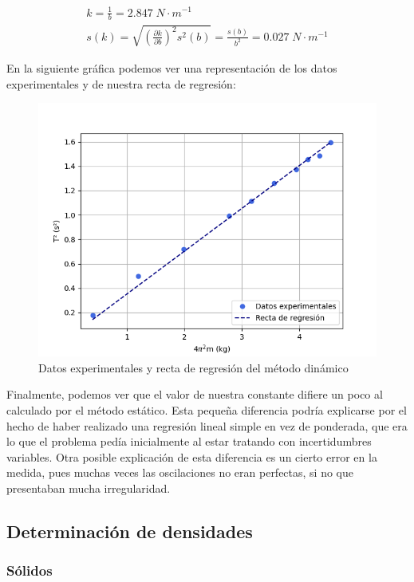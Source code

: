 \documentclass[a4paper,12pt,titlepage]{article}
\begin{document}
\begin{equation}
    \begin{gathered}
        k = \frac{1}{b} = 2.847 \; N\cdot m^{-1} \\
        s(k) = \sqrt{\left (\frac{\partial k}{\partial b} \right )^2s^2(b)} = \frac{s(b)}{b^2} = 0.027 \; N\cdot m^{-1}
    \end{gathered}
\end{equation}

En la siguiente gráfica podemos ver una representación de los datos experimentales y de nuestra recta de regresión:

\begin{figure}[h!]
    \centering
    \includegraphics[width=0.75\linewidth]{Images/RegDinamico.png}
    \caption{Datos experimentales y recta de regresión del método dinámico}
\end{figure}

Finalmente, podemos ver que el valor de nuestra constante difiere un poco al calculado por el método estático. Esta pequeña diferencia podría explicarse por el hecho de haber realizado una regresión lineal simple en vez de ponderada, que era lo que el problema pedía inicialmente al estar tratando con incertidumbres variables. Otra posible explicación de esta diferencia es un cierto error en la medida, pues muchas veces las oscilaciones no eran perfectas, si no que presentaban mucha irregularidad.



\subsection{Determinación de densidades}

\subsubsection{Sólidos}
\end{document}
